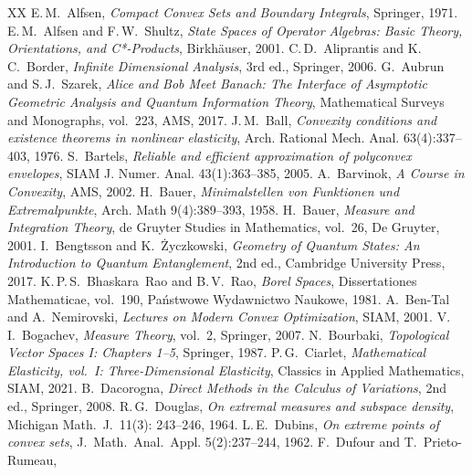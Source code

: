 \documentclass[a4paper,11pt,reqno]{amsart}
\numberwithin{equation}{section}
\theoremstyle{plain}
\theoremstyle{definition}
\begin{document}
\begin{thebibliography}{XX}
%
E.\,M.~Alfsen,
\emph{Compact Convex Sets and Boundary Integrals},
Springer, 1971.
%
E.\,M.~Alfsen and F.\,W.~Shultz,
\emph{State Spaces of Operator Algebras: Basic Theory, Orientations, and C*-Products},
Birkh{\"a}user, 2001. 
%
C.\,D.~Aliprantis and K.\,C.~Border, 
\emph{Infinite Dimensional Analysis},
3rd ed., 
Springer, 2006. 
%
G.~Aubrun and S.\,J.~Szarek, 
\emph{Alice and Bob Meet Banach: 
The Interface of Asymptotic Geometric Analysis and Quantum Information Theory},
Mathematical Surveys and Monographs, vol.~223, 
AMS, 2017.
%
J.\,M.~Ball,
\emph{Convexity conditions and existence theorems in nonlinear elasticity},
Arch. Rational Mech. Anal. 63(4):337--403, 1976.
%
S.~Bartels,
\emph{Reliable and efficient approximation of polyconvex envelopes},
SIAM J. Numer. Anal. 43(1):363--385, 2005.
%
A.~Barvinok,
\emph{A Course in Convexity},
AMS, 2002.
%
H.~Bauer,
\emph{Minimalstellen von Funktionen und Extremalpunkte},
Arch. Math 9(4):389--393, 1958.
%
H.~Bauer, 
\emph{Measure and Integration Theory},
de Gruyter Studies in Mathematics, vol.~26,
De Gruyter, 2001.
%
I.~Bengtsson and K.~{\.Z}yczkowski, 
\emph{Geometry of Quantum States: An Introduction to Quantum Entanglement}, 
2nd ed., 
Cambridge University Press, 2017.
%
K.\,P.\,S.~Bhaskara~Rao and B.\,V.~Rao,
\emph{Borel Spaces},
Dissertationes Mathematicae, vol.~190,
Pa\'{n}stwowe Wydawnictwo Naukowe, 1981.
%
A.~Ben-Tal and A.~Nemirovski,
\emph{Lectures on Modern Convex Optimization},
SIAM, 2001. 
%
V.\,I.~Bogachev, 
\emph{Measure Theory}, 
vol.~2,
Springer, 
2007.
%
N.~Bourbaki, 
\emph{Topological Vector Spaces I: Chapters 1--5}, 
Springer, 1987. 
%
P.\,G.~Ciarlet, 
\emph{Mathematical Elasticity, vol.~I: Three-Dimensional Elasticity},  
Classics in Applied Mathematics, 
SIAM, 2021.
%
B.~Dacorogna,
\emph{Direct Methods in the Calculus of Variations},
2nd ed., 
Springer, 2008.
%
R.\,G.~Douglas,
\emph{On extremal measures and subspace density},
Michigan Math.\ J.\ 11(3): 243--246,  1964.
%
L.\,E.~Dubins,
\emph{On extreme points of convex sets},
J.~Math.~Anal.~Appl. 5(2):237--244, 1962.
%
F.~Dufour and T.~Prieto-Rumeau, 

\end{thebibliography}
\end{document}
